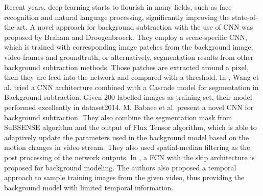 \documentclass[journal]{IEEEtran}
\begin{document}
%
Recent years, deep learning starts to flourish in many fields, such as face recognition and natural language processing, significantly improving the state-of-the-art. A novel approach for background subtraction with the use of CNN was proposed by Braham and Droogenbroeck\cite{Braham2016deep}. They employ a scene-specific CNN, which is trained with corresponding image patches from the background image, video frames and groundtruth, or alternatively, segmentation results from other background subtraction methods. Those patches are extracted around a pixel, then they are feed into the network and compared with a threshold.
%
In \cite{wang2016PRL}, Wang et al. tried a CNN architecture combined with a Cascade model for segmentation in Background subtraction. Given 200 labelled images as training set, their model performed excellently in dataset2014.
%
M. Babaee et al. \cite{Babaee2017deep} present a novel CNN for background subtraction. They also combine the segmentation mask from SuBSENSE\cite{St-Charles2015SuBSENSE} algorithm and the output of Flux Tensor algorithm, which is able to adaptively update the parameters used in the background model based on the motion changes in video stream. They also used spatial-median filtering as the post processing of the network outputs.
In \cite{Yang2018DBMF}, a FCN with the skip architecture is proposed for background modeling. 
The authors also proposed a temporal approach to sample training images from the given video, thus providing the background model with limited temporal information. 
\end{document}
